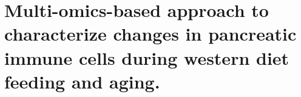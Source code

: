 
\chapter{Multi-omics-based approach to characterize changes in pancreatic immune cells during western diet feeding and aging.  }
\label{chapter2}

\newpage



